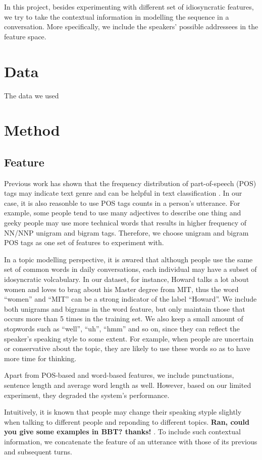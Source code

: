 \documentclass[11pt,letterpaper]{article}
\begin{document}
In this project, besides experimenting with different set of idiosyncratic features,
we try to take the contextual information in modelling the sequence in a conversation.
More specifically, we include the speakers' possible addressees in the feature space. 
  
\section{Data}
The data we used 

\section{Method}
\subsection{Feature}
Previous work has shown that the frequency distribution of part-of-speech (POS) tags may indicate text genre 
and can be helpful in text classification \cite{Ott:11}. In our case, it is also reasonble to use POS tags
counts in a person's utterance. For example, some people tend to use many adjectives to describe one thing
and geeky people may use more technical words that results in higher frequency of NN/NNP unigram and bigram tags.
Therefore, we choose unigram and bigram POS tags as one set of features to experiment with.

In a topic modelling perspective, it is awared that although people use the same set of common words in daily conversations,
each individual may have a subset of idosyncratic volcabulary. In our dataset, for instance, Howard talks a lot
about women and loves to brag about his Master degree from MIT, thus the word ``women'' and ``MIT'' can be a 
strong indicator of the label ``Howard''. We include both unigrams and bigrams in the word feature, but only 
maintain those that occurs more than 5 times in the training set. We also keep a small amount of stopwords such
as ``well'', ``uh'', ``hmm'' and so on, since they can reflect the speaker's speaking style to some extent. 
For example, when people are uncertain or conservative about the topic, they are likely to use these words 
so as to have more time for thinking. 

Apart from POS-based and word-based features, we include punctuations, sentence length and average word length
as well. However, based on our limited experiment, they degraded the system's performance.

Intuitively, it is known that people may change their speaking styple slightly when talking to different people and reponding to different topics. 
{\bf Ran, could you give some examples in BBT? thanks! }. To include such contextual information, we concatenate
the feature of an utterance with those of its previous and subsequent turns.
\end{document}
